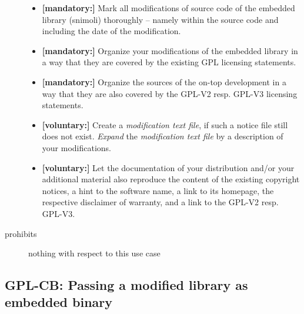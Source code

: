 \begin{description}
\begin{itemize}
  \item \textbf{[mandatory:]} Mark all modifications of source code of the
  embedded library (snimoli) thoroughly -- namely within the source code and
  including the date of the modification.
  
  \item \textbf{[mandatory:]} Organize your modifications of the embedded
  library in a way that they are covered by the existing GPL licensing
  statements. 
  
  \item \textbf{[mandatory:]} Organize the sources of the on-top development in
  a way that they are also covered by the GPL-V2 resp. GPL-V3 licensing
  statements.
     
  \item \textbf{[voluntary:]} Create a \emph{modification text file}, if such a
  notice file still does not exist. \emph{Expand} the \emph{modification text
  file} by a description of your modifications.
  
  \item \textbf{[voluntary:]} Let the documentation of your distribution and/or
  your additional material also reproduce the content of the existing
  copyright notices, a hint to the software name, a link to its homepage,
  the respective disclaimer of warranty, and a link to the GPL-V2 resp.
  GPL-V3.
  
\end{itemize}

\item[prohibits] nothing with respect to this use case

\end{description}

\subsection{GPL-CB: Passing a modified library as embedded binary}
\label{OSUC-10B-GPL}

